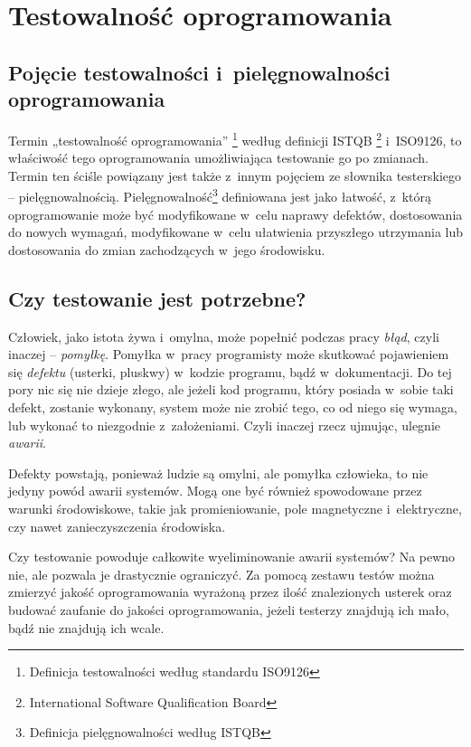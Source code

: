 \chapter{Testowalność oprogramowania}
\label{testowalnosc}
\section{Pojęcie testowalności i~pielęgnowalności \newline oprogramowania}
Termin „testowalność oprogramowania” \footnote{Definicja testowalności według standardu ISO9126}  według definicji ISTQB \footnote{International Software Qualification Board}  i~ISO9126, to właściwość tego oprogramowania umożliwiająca testowanie go po zmianach. Termin ten ściśle powiązany jest także z~innym pojęciem ze słownika testerskiego – pielęgnowalnością. Pielęgnowalność\footnote{Definicja pielęgnowalności według ISTQB} definiowana jest jako łatwość, z~którą oprogramowanie może być modyfikowane w~celu naprawy defektów, dostosowania do nowych wymagań, modyfikowane w~celu ułatwienia przyszłego utrzymania lub dostosowania do zmian zachodzących w~jego środowisku.

\section{Czy testowanie jest potrzebne?}
\label{czy_testowanie_potrzebne}
Człowiek, jako istota żywa i~omylna, może popełnić podczas pracy \textit{błąd}, czyli inaczej – \textit{pomyłkę}. Pomyłka w~pracy programisty może skutkować pojawieniem się \textit{defektu} (usterki, pluskwy) w~kodzie programu, bądź w~dokumentacji. Do tej pory nic się nie dzieje złego, ale jeżeli kod programu, który posiada w~sobie taki defekt, zostanie wykonany, system może nie zrobić tego, co od niego się wymaga, lub wykonać to niezgodnie z~założeniami. Czyli inaczej rzecz ujmując, ulegnie \textit{awarii}. 

Defekty powstają, ponieważ ludzie są omylni, ale pomyłka człowieka, to nie jedyny powód awarii systemów. Mogą one być również spowodowane przez warunki środowiskowe, takie jak promieniowanie, pole magnetyczne i~elektryczne, czy nawet zanieczyszczenia środowiska.

Czy testowanie powoduje całkowite wyeliminowanie awarii systemów? Na pewno nie, ale pozwala je drastycznie ograniczyć. Za pomocą zestawu testów można zmierzyć jakość oprogramowania wyrażoną przez ilość znalezionych usterek oraz budować zaufanie do jakości oprogramowania, jeżeli testerzy znajdują ich mało, bądź nie znajdują ich wcale.


